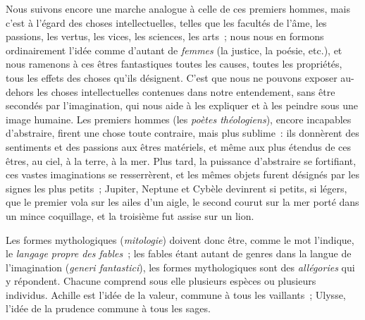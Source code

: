 \documentclass[french,twoside]{book} %
\begin{document}
Nous suivons encore une marche analogue à celle de ces premiers hommes, mais c’est à l’égard  des choses intellectuelles, telles que les facultés de l’âme, les passions, les vertus, les vices, les sciences, les arts ; nous nous en formons ordinairement l’idée comme d’autant de {\itshape femmes} (la justice, la poésie, etc.), et nous ramenons à ces êtres fantastiques toutes les causes, toutes les propriétés, tous les effets des choses qu’ils désignent. C’est que nous ne pouvons exposer au-dehors les choses intellectuelles contenues dans notre entendement, sans être secondés par l’imagination, qui nous aide à les expliquer et à les peindre sous une image humaine. Les premiers hommes (les {\itshape poètes théologiens}), encore incapables d’abstraire, firent une chose toute contraire, mais plus sublime : ils donnèrent des sentiments et des passions aux êtres matériels, et même aux plus étendus de ces êtres, au ciel, à la terre, à la mer. Plus tard, la puissance d’abstraire se fortifiant, ces vastes imaginations se resserrèrent, et les mêmes objets furent désignés par les signes les plus petits ; Jupiter, Neptune et Cybèle devinrent si petits, si légers, que le premier vola sur les ailes d’un aigle, le second courut sur la mer porté dans un mince coquillage, et la troisième fut assise sur un lion.\par
Les formes mythologiques ({\itshape mitologie}) doivent donc être, comme le mot l’indique, le {\itshape langage propre des fables} ; les fables étant autant de genres dans la langue de l’imagination ({\itshape generi fantastici}), les formes mythologiques sont des {\itshape allégories} qui y répondent. Chacune comprend sous elle plusieurs espèces  ou plusieurs individus. Achille est l’idée de la valeur, commune à tous les vaillants ; Ulysse, l’idée de la prudence commune à tous les sages.
\end{document}
